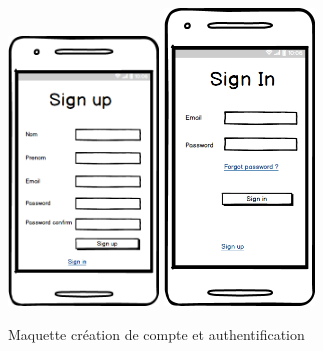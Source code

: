 \documentclass[12pt,a4paper]{report}
\begin{document}
			\begin{figure}
			\includegraphics[width=4cm]{./graphics/mk2.png}\hfill
			\includegraphics[width=4cm]{./graphics/mk1.png}
			\caption{Maquette création de compte et authentification}
			\end{figure}
\end{document}
